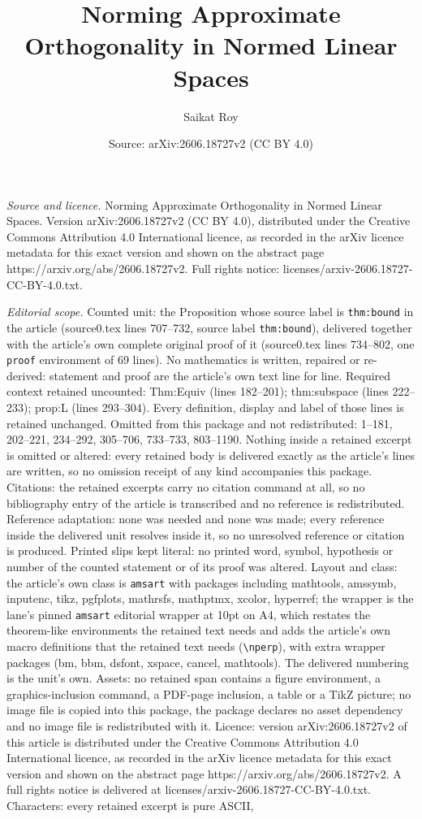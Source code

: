\documentclass[10pt,a4paper]{amsart}
\title[Norming Approximate Orthogonality in Normed Linear Spaces]{Norming Approximate Orthogonality in Normed Linear Spaces}
\author{Saikat Roy}
\date{Source: arXiv:2606.18727v2 (CC BY 4.0)}
\begin{document}
\maketitle

\noindent\emph{Source and licence.} Norming Approximate Orthogonality in Normed Linear Spaces. Version arXiv:2606.18727v2 (CC BY 4.0), distributed under the Creative Commons Attribution 4.0 International licence, as recorded in the arXiv licence metadata for this exact version and shown on the abstract page https://arxiv.org/abs/2606.18727v2. Full rights notice: licenses/arxiv-2606.18727-CC-BY-4.0.txt.\par\smallskip

\noindent\textit{Editorial scope.} Counted unit: the Proposition whose source label is \texttt{thm:bound} in the article (source0.tex lines 707--732, source label \texttt{thm:bound}), delivered together with the article's own complete original proof of it (source0.tex lines 734--802, one \texttt{proof} environment of 69 lines). No mathematics is written, repaired or re-derived: statement and proof are the article's own text line for line. Required context retained uncounted: Thm:Equiv (lines 182--201); thm:subspace (lines 222--233); prop:L (lines 293--304). Every definition, display and label of those lines is retained unchanged. Omitted from this package and not redistributed: 1--181, 202--221, 234--292, 305--706, 733--733, 803--1190. Nothing inside a retained excerpt is omitted or altered: every retained body is delivered exactly as the article's lines are written, so no omission receipt of any kind accompanies this package. Citations: the retained excerpts carry no citation command at all, so no bibliography entry of the article is transcribed and no reference is redistributed. Reference adaptation: none was needed and none was made; every reference inside the delivered unit resolves inside it, so no unresolved reference or citation is produced. Printed slips kept literal: no printed word, symbol, hypothesis or number of the counted statement or of its proof was altered. Layout and class: the article's own class is \texttt{amsart} with packages including mathtools, amssymb, inputenc, tikz, pgfplots, mathrsfs, mathptmx, xcolor, hyperref; the wrapper is the lane's pinned \texttt{amsart} editorial wrapper at 10pt on A4, which restates the theorem-like environments the retained text needs and adds the article's own macro definitions that the retained text needs (\texttt{\textbackslash nperp}), with extra wrapper packages (bm, bbm, dsfont, xspace, cancel, mathtools). The delivered numbering is the unit's own. Assets: no retained span contains a figure environment, a graphics-inclusion command, a PDF-page inclusion, a table or a TikZ picture; no image file is copied into this package, the package declares no asset dependency and no image file is redistributed with it. Licence: version arXiv:2606.18727v2 of this article is distributed under the Creative Commons Attribution 4.0 International licence, as recorded in the arXiv licence metadata for this exact version and shown on the abstract page https://arxiv.org/abs/2606.18727v2. A full rights notice is delivered at licenses/arxiv-2606.18727-CC-BY-4.0.txt. Characters: every retained excerpt is pure ASCII, 
\end{document}
